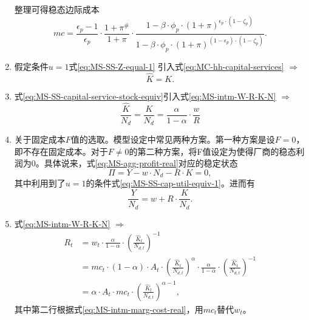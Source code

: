 \begin{enumerate}
整理可得稳态边际成本
\begin{equation}
\label{eq:MS-SS-marg-cost}
mc = \frac{\epsilon_p - 1 }{\epsilon_p} \cdot \frac{1+\pi^{\#}}{1+\pi} \cdot \frac{
  1 - \beta \cdot \phi_p \cdot \left( 1 + \pi \right)^{\epsilon_p \cdot \left( 1 - \zeta_p \right)}
}{
  1 - \beta \cdot \phi_p \cdot \left( 1 + \pi \right)^{\left( 1- \epsilon_p \right) \cdot \left( 1- \zeta_p \right)}
}.
\end{equation}

\item 假定条件$u = 1$式\eqref{eq:MS-SS-Z-equal-1}
引入式\eqref{eq:MC-hh-capital-services} $\Rightarrow$
\begin{equation}
\label{eq:MS-SS-capital-service-stock-equiv}
\hat{K} = K.
\end{equation}

\item 式\eqref{eq:MS-SS-capital-service-stock-equiv}引入式\eqref{eq:MS-intm-W-R-K-N} $\Rightarrow$
\begin{equation}
\label{eq:MS-SS-K-Nd-ratio}
\frac{\hat{K}}{N_{d}} = \frac{K}{N_d} = \frac{\alpha}{1-\alpha} \cdot \frac{w}{R}
\end{equation}

\item 关于固定成本$F$值的选取。模型设定中常见两种方案。第一种方案是设$F=0$，即不存在固定成本。对于$F \neq 0$的第二种方案，将F值设定为使得厂商的稳态利润为0。具体说来，式\eqref{eq:MS-agg-profit-real}对应的稳定状态
\begin{equation*}
\Pi = Y - w \cdot N_d - R \cdot K = 0,
\end{equation*}
其中利用到了$u=1$的条件式\eqref{eq:MS-SS-cap-util-equiv-1}。进而有
\begin{equation}
\label{eq:MS-SS-Y-Nd-ratio}
\frac{Y}{N_d} = w + R \cdot \frac{K}{N_d}.
\end{equation}

\item 式\eqref{eq:MS-intm-W-R-K-N} $\Rightarrow$
\begin{equation}
\label{eq:MS-intm-R-mc}
\begin{split}
R_t &= w_t \cdot \frac{\alpha}{1 - \alpha} \cdot \left( \frac{\hat{K}_t}{N_{d,t}} \right)^{-1} \\
&=mc_t \cdot \left(1 - \alpha \right) \cdot A_t \cdot \left( \frac{\hat{K}_t}{N_{d,t}} \right)^{\alpha} \cdot \frac{\alpha}{1 - \alpha} \cdot \left( \frac{\hat{K}_t}{N_{d,t}} \right)^{-1} \\
&= \alpha \cdot A_t \cdot mc_t \cdot \left( \frac{\hat{K}_t}{N_{d,t}}\right) ^{\alpha - 1},
\end{split}
\end{equation}
其中第二行根据式\eqref{eq:MS-intm-marg-cost-real}，用$mc_t$替代$w_t$。


\end{enumerate}
